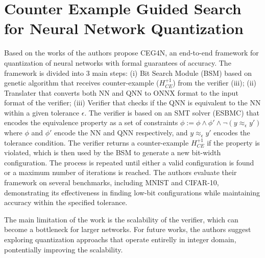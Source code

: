 \section {Counter Example Guided Search for Neural Network Quantization}
Based on the works of \cite{katz2017reluplex,katz2019marabou} the authors propose CEG4N, an end-to-end framework for quantization of neural networks with formal guarantees of accuracy. The framework is divided into 3 main steps: (i) Bit Search Module (BSM) based on genetic algorithm that receives counter-example ($H^{+1}_{CE}$) from the verifier (iii); (ii) Translater that converts both NN and QNN to ONNX format to the input format of the verifier; (iii) Verifier that checks if the QNN is equivalent to the NN within a given tolerance $\epsilon$. The verifier is based on an SMT solver (ESBMC) that encodes the equivalence property as a set of constraints   
$\phi := \phi \land \phi' \land \neg(y \approx_\epsilon y')$ where $\phi$ and $\phi'$ encode the NN and QNN respectively, and $y \approx_\epsilon y'$ encodes the tolerance condition. The verifier returns a counter-example $H^{+1}_{CE}$ if the property is violated, which is then used by the BSM to generate a new bit-width configuration. The process is repeated until either a valid configuration is found or a maximum number of iterations is reached. The authors evaluate their framework on several benchmarks, including MNIST and CIFAR-10, demonstrating its effectiveness in finding low-bit configurations while maintaining accuracy within the specified tolerance.

The main limitation of the work is the scalability of the verifier, which can become a bottleneck for larger networks. For future works, the authors suggest exploring quantization approachs that operate entirelly in integer domain, pontentially improving the scalability. 

 